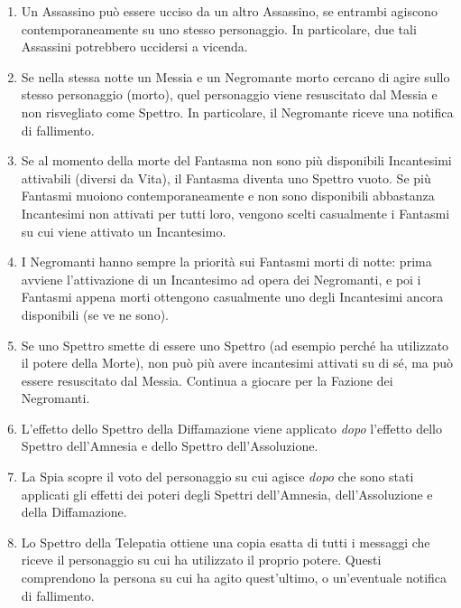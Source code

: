 \documentclass[a4paper,10pt]{article}
\begin{document}
\begin{enumerate}
	\item Un Assassino può essere ucciso da un altro Assassino, se entrambi agiscono contemporaneamente su uno stesso personaggio. In particolare, due tali Assassini potrebbero uccidersi a vicenda.
	
	\item Se nella stessa notte un Messia e un Negromante morto cercano di agire sullo stesso personaggio (morto), quel personaggio viene resuscitato dal Messia e non risvegliato come Spettro. In particolare, il Negromante riceve una notifica di fallimento.
	
	\item Se al momento della morte del Fantasma non sono più disponibili Incantesimi attivabili (diversi da Vita), il Fantasma diventa uno Spettro vuoto. Se più Fantasmi muoiono contemporaneamente e non sono disponibili abbastanza Incantesimi non attivati per tutti loro, vengono scelti casualmente i Fantasmi su cui viene attivato un Incantesimo.
	
	\item I Negromanti hanno sempre la priorità sui Fantasmi morti di notte: prima avviene l'attivazione di un Incantesimo ad opera dei Negromanti, e poi i Fantasmi appena morti ottengono casualmente uno degli Incantesimi ancora disponibili (se ve ne sono).

	\item Se uno Spettro smette di essere uno Spettro (ad esempio perché ha utilizzato il potere della Morte), non può più avere incantesimi attivati su di sé, ma può essere resuscitato dal Messia. Continua a giocare per la Fazione dei Negromanti.
	
	\item L'effetto dello Spettro della Diffamazione viene applicato \emph{dopo} l'effetto dello Spettro dell'Amnesia e dello Spettro dell'Assoluzione.
	
	\item La Spia scopre il voto del personaggio su cui agisce \emph{dopo} che sono stati applicati gli effetti dei poteri degli Spettri dell'Amnesia, dell'Assoluzione e della Diffamazione.
	
	\item Lo Spettro della Telepatia ottiene una copia esatta di tutti i messaggi che riceve il personaggio su cui ha utilizzato il proprio potere. Questi comprendono la persona su cui ha agito quest'ultimo, o un'eventuale notifica di fallimento.
	

\end{enumerate}
\end{document}
